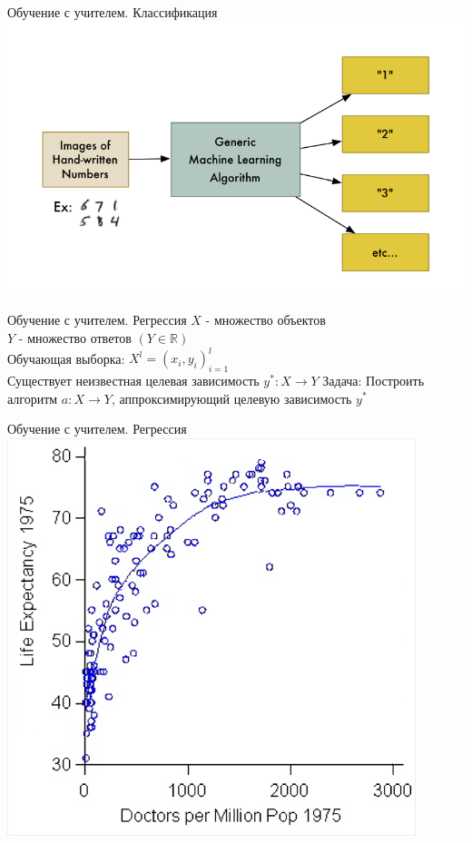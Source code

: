 \documentclass[10pt]{beamer}
\begin{document}
{
\begin{frame}{Обучение с учителем. Классификация}
  \centering
  \includegraphics[width=0.9 \linewidth, height=0.9 \textheight, keepaspectratio]{images/mnist}\\
\end{frame}
}

{
\begin{frame}{Обучение с учителем. Регрессия}
  $X$ - множество объектов \\
	$Y$ - множество ответов ${(Y \in \mathbb{R})}$\\
	Обучающая выборка: ${X^l = (x_i, y_i)_{i=1}^l}$ \\ 
	Существует неизвестная целевая зависимость $y^*: X \rightarrow Y$
	\bigbreak
	\bigbreak
	\alert{Задача}: Построить алгоритм ${a \colon X \rightarrow Y}$, аппроксимирующий целевую зависимость $y^*$
\end{frame}
}

{
\begin{frame}{Обучение с учителем. Регрессия}
  \centering
  \includegraphics[width=0.7 \linewidth, height=0.7 \textheight, keepaspectratio]{images/regression}\\
\end{frame}
}
\end{document}
